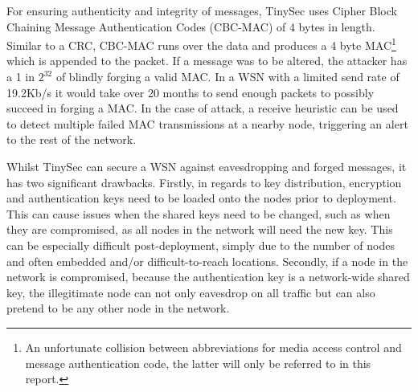 For ensuring authenticity and integrity of messages, TinySec uses Cipher Block Chaining Message Authentication Codes (CBC-MAC) of 4 bytes in length. Similar to a CRC, CBC-MAC runs over the data and produces a 4 byte MAC\footnote{An unfortunate collision between abbreviations for media access control and message authentication code, the latter will only be referred to in this report.} which is appended to the packet. If a message was to be altered, the attacker has a 1 in $2^{32}$ of blindly forging a valid MAC. In a WSN with a limited send rate of 19.2Kb/s it would take over 20 months to send enough packets to possibly succeed in forging a MAC. In the case of attack, a receive heuristic can be used to detect multiple failed MAC transmissions at a nearby node, triggering an alert to the rest of the network.

Whilst TinySec can secure a WSN against eavesdropping and forged messages, it has two significant drawbacks. Firstly, in regards to key distribution, encryption and authentication keys need to be loaded onto the nodes prior to deployment. This can cause issues when the shared keys need to be changed, such as when they are compromised, as all nodes in the network will need the new key. This can be especially difficult post-deployment, simply due to the number of nodes and often embedded and/or difficult-to-reach locations. Secondly, if a node in the network is compromised, because the authentication key is a network-wide shared key, the illegitimate node can not only eavesdrop on all traffic but can also pretend to be any other node in the network.